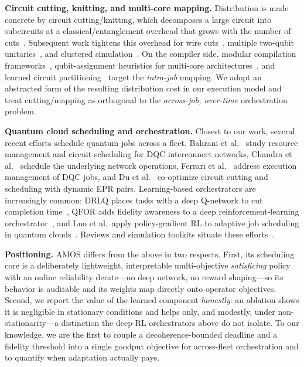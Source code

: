 \documentclass[conference]{IEEEtran}
\begin{document}
\textbf{Circuit cutting, knitting, and multi-core mapping.} Distribution is made
concrete by circuit cutting/knitting, which decomposes a large circuit into
subcircuits at a classical/entanglement overhead that grows with the number of
cuts~\cite{piveteau2024knitting,du2024cutting}. Subsequent work tightens this
overhead for wire cuts~\cite{harada2024wire}, multiple two-qubit
unitaries~\cite{schmitt2025cutting}, and clustered simulation~\cite{harrow2025optimal}.
On the compiler side, modular compilation frameworks~\cite{ferrari2023modular},
qubit-assignment heuristics for multi-core
architectures~\cite{escofet2023hungarian}, and learned circuit
partitioning~\cite{pastor2024partitioning} target the \emph{intra-job} mapping.
We adopt an abstracted form of the resulting distribution cost in our execution
model and treat cutting/mapping as orthogonal to the \emph{across-job, over-time}
orchestration problem.

\textbf{Quantum cloud scheduling and orchestration.} Closest to our work, several
recent efforts schedule quantum jobs across a fleet. Bahrani et
al.~\cite{bahrani2024resource} study resource management and circuit scheduling
for DQC interconnect networks, Chandra et al.~\cite{chandra2025netops} schedule
the underlying network operations, Ferrari et al.~\cite{ferrari2024execution}
address execution management of DQC jobs, and Du et al.~\cite{du2024cutting}
co-optimize circuit cutting and scheduling with dynamic EPR pairs. Learning-based
orchestrators are increasingly common: DRLQ places tasks with a deep Q-network to
cut completion time~\cite{nguyen2024drlq}, QFOR adds fidelity awareness to a deep
reinforcement-learning orchestrator~\cite{nguyen2025qfor}, and Luo et al.\ apply
policy-gradient RL to adaptive job scheduling in quantum clouds~\cite{luo2025rl}.
Reviews and simulation toolkits situate these
efforts~\cite{nguyen2024review,nguyen2024iquantum}.

\textbf{Positioning.} AMOS differs from the above in two respects. First, its
scheduling core is a deliberately lightweight, interpretable multi-objective
\emph{satisficing} policy with an online reliability derate---no deep network, no
reward shaping---so its behavior is auditable and its weights map directly onto
operator objectives. Second, we report the value of the learned component
\emph{honestly}: an ablation shows it is negligible in stationary conditions and
helps only, and modestly, under non-stationarity---a distinction the deep-RL
orchestrators above do not isolate. To our knowledge, we are the first to couple a
decoherence-bounded deadline and a fidelity threshold into a single goodput
objective for across-fleet orchestration and to quantify when adaptation actually
pays.
\end{document}
